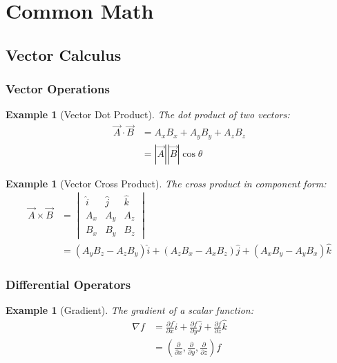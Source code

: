 \documentclass{article}
\newtheorem{example}[theorem]{Example}
\begin{document}
\newpage
\section{Common Math}
\subsubsection*{}

\subsection{Vector Calculus}

\subsubsection{Vector Operations}
\begin{example}[Vector Dot Product]
The dot product of two vectors:
\begin{align*}
    \vec{A} \cdot \vec{B} &= A_x B_x + A_y B_y + A_z B_z \\
    &= |\vec{A}||\vec{B}|\cos\theta
\end{align*}
\end{example}

\begin{example}[Vector Cross Product]
The cross product in component form:
\begin{align*}
    \vec{A} \times \vec{B} &= \begin{vmatrix}
        \hat{i} & \hat{j} & \hat{k} \\
        A_x & A_y & A_z \\
        B_x & B_y & B_z
    \end{vmatrix} \\
    &= (A_y B_z - A_z B_y)\hat{i} + (A_z B_x - A_x B_z)\hat{j} + (A_x B_y - A_y B_x)\hat{k}
\end{align*}
\end{example}

\subsubsection{Differential Operators}
\begin{example}[Gradient]
The gradient of a scalar function:
\begin{align*}
    \nabla f &= \frac{\partial f}{\partial x}\hat{i} + \frac{\partial f}{\partial y}\hat{j} + \frac{\partial f}{\partial z}\hat{k} \\
    &= \left(\frac{\partial}{\partial x}, \frac{\partial}{\partial y}, \frac{\partial}{\partial z}\right)f
\end{align*}
\end{example}
\end{document}
